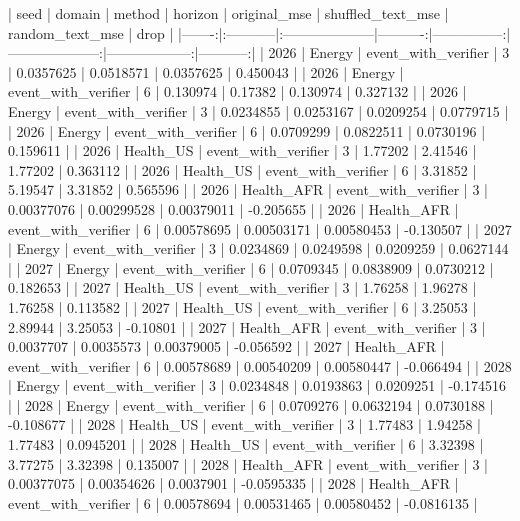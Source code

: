 {{{{{{{{{{|   seed | domain     | method              |   horizon |   original_mse |   shuffled_text_mse |   random_text_mse |       drop |
|-------:|:-----------|:--------------------|----------:|---------------:|--------------------:|------------------:|-----------:|
|   2026 | Energy     | event_with_verifier |         3 |     0.0357625  |          0.0518571  |        0.0357625  |  0.450043  |
|   2026 | Energy     | event_with_verifier |         6 |     0.130974   |          0.17382    |        0.130974   |  0.327132  |
|   2026 | Energy     | event_with_verifier |         3 |     0.0234855  |          0.0253167  |        0.0209254  |  0.0779715 |
|   2026 | Energy     | event_with_verifier |         6 |     0.0709299  |          0.0822511  |        0.0730196  |  0.159611  |
|   2026 | Health_US  | event_with_verifier |         3 |     1.77202    |          2.41546    |        1.77202    |  0.363112  |
|   2026 | Health_US  | event_with_verifier |         6 |     3.31852    |          5.19547    |        3.31852    |  0.565596  |
|   2026 | Health_AFR | event_with_verifier |         3 |     0.00377076 |          0.00299528 |        0.00379011 | -0.205655  |
|   2026 | Health_AFR | event_with_verifier |         6 |     0.00578695 |          0.00503171 |        0.00580453 | -0.130507  |
|   2027 | Energy     | event_with_verifier |         3 |     0.0234869  |          0.0249598  |        0.0209259  |  0.0627144 |
|   2027 | Energy     | event_with_verifier |         6 |     0.0709345  |          0.0838909  |        0.0730212  |  0.182653  |
|   2027 | Health_US  | event_with_verifier |         3 |     1.76258    |          1.96278    |        1.76258    |  0.113582  |
|   2027 | Health_US  | event_with_verifier |         6 |     3.25053    |          2.89944    |        3.25053    | -0.10801   |
|   2027 | Health_AFR | event_with_verifier |         3 |     0.0037707  |          0.0035573  |        0.00379005 | -0.056592  |
|   2027 | Health_AFR | event_with_verifier |         6 |     0.00578689 |          0.00540209 |        0.00580447 | -0.066494  |
|   2028 | Energy     | event_with_verifier |         3 |     0.0234848  |          0.0193863  |        0.0209251  | -0.174516  |
|   2028 | Energy     | event_with_verifier |         6 |     0.0709276  |          0.0632194  |        0.0730188  | -0.108677  |
|   2028 | Health_US  | event_with_verifier |         3 |     1.77483    |          1.94258    |        1.77483    |  0.0945201 |
|   2028 | Health_US  | event_with_verifier |         6 |     3.32398    |          3.77275    |        3.32398    |  0.135007  |
|   2028 | Health_AFR | event_with_verifier |         3 |     0.00377075 |          0.00354626 |        0.0037901  | -0.0595335 |
|   2028 | Health_AFR | event_with_verifier |         6 |     0.00578694 |          0.00531465 |        0.00580452 | -0.0816135 |

}}}}}}}}}}
